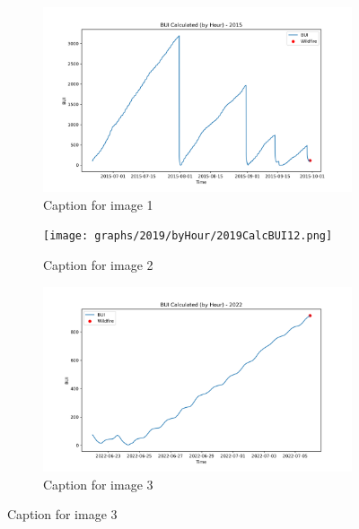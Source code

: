 \begin{figure}[h]
	\centering
	\caption{Caption for the whole figure}
	\begin{subfigure}{0.3\textwidth}
		\centering
		\includegraphics[width=\textwidth]{graphs/2015/byHour/2015CalcBUI12.png}
		\caption{Caption for image 1}
		\label{fig:img1}
	\end{subfigure}
	\hfill
	\begin{subfigure}{0.3\textwidth}
		\centering
		\texttt{[image: graphs/2019/byHour/2019CalcBUI12.png]}
		\caption{Caption for image 2}
		\label{fig:img2}
	\end{subfigure}
	\hfill
	\begin{subfigure}{0.3\textwidth}
		\centering
		\includegraphics[width=\textwidth]{graphs/2022/2022CalcBUI12.png}
		\caption{Caption for image 3}
		\label{fig:img3}
	\end{subfigure}
	
	\label{fig:all_images}
\end{figure}

\FloatBarrier


